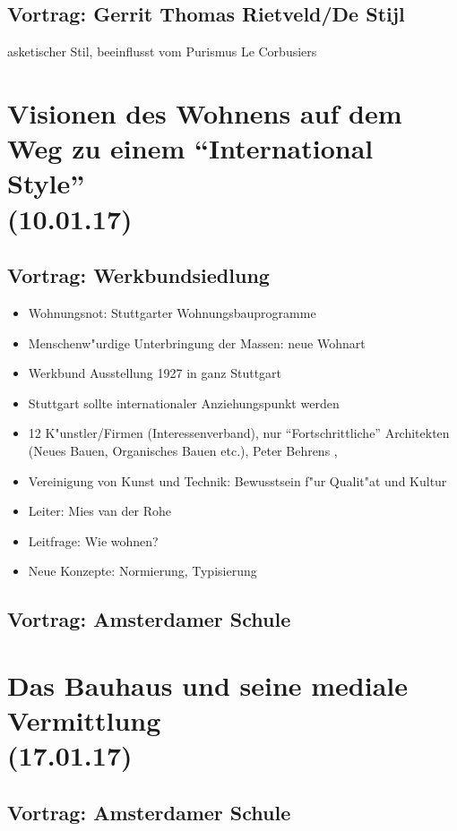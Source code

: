 \documentclass[emulatestandardclasses]{scrartcl}
\begin{document}
\subsection{Vortrag: Gerrit Thomas Rietveld/De Stijl}

asketischer Stil, beeinflusst vom Purismus Le Corbusiers

\section{Visionen des Wohnens auf dem Weg zu einem “International Style”\\(10.01.17)}

\subsection{Vortrag: Werkbundsiedlung}

\begin{itemize}
  \item Wohnungsnot: Stuttgarter Wohnungsbauprogramme
  \item Menschenw"urdige Unterbringung der Massen: neue Wohnart
  \item Werkbund Ausstellung 1927 in ganz Stuttgart
  \item Stuttgart sollte internationaler Anziehungspunkt werden
  \item 12 K"unstler/Firmen (Interessenverband), nur "`Fortschrittliche"' Architekten (Neues Bauen, Organisches Bauen etc.), Peter Behrens , 
  \item Vereinigung von Kunst und Technik: Bewusstsein f"ur Qualit"at und Kultur
  \item Leiter: Mies van der Rohe
  \item Leitfrage: Wie wohnen?
  \item Neue Konzepte: Normierung, Typisierung
\end{itemize}



\subsection{Vortrag: Amsterdamer Schule}


\section{Das Bauhaus und seine mediale Vermittlung\\(17.01.17)}


\subsection{Vortrag: Amsterdamer Schule}
\end{document}
